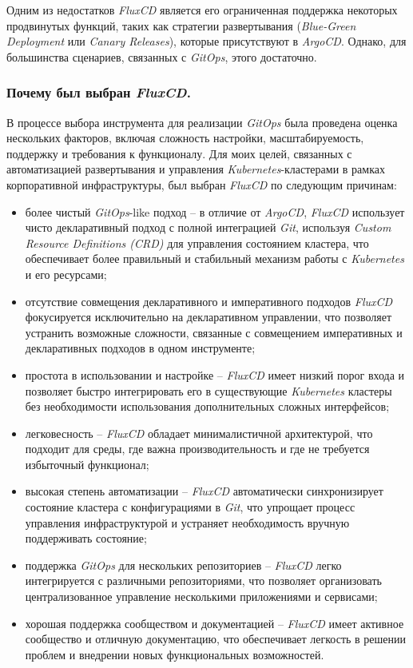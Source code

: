 Одним из недостатков \textit{FluxCD} является его ограниченная поддержка некоторых продвинутых функций, таких как стратегии развертывания (\textit{Blue-Green Deployment} или \textit{Canary Releases}), которые присутствуют в \textit{ArgoCD}. Однако, для большинства сценариев, связанных с \textit{GitOps}, этого достаточно.

\subsubsection{Почему был выбран \textit{FluxCD}.}
В процессе выбора инструмента для реализации \textit{GitOps} была проведена оценка нескольких факторов, включая сложность настройки, масштабируемость, поддержку и требования к функционалу. Для моих целей, связанных с автоматизацией развертывания и управления \textit{Kubernetes}-кластерами в рамках корпоративной инфраструктуры, был выбран \textit{FluxCD} по следующим причинам:

\begin{itemize}
    \item более чистый \textit{GitOps}-like подход -- в отличие от \textit{ArgoCD}, \textit{FluxCD} использует чисто декларативный подход с полной интеграцией \textit{Git}, используя \textit{Custom Resource Definitions (CRD)} для управления состоянием кластера, что обеспечивает более правильный и стабильный механизм работы с \textit{Kubernetes} и его ресурсами; 
    \item отсутствие совмещения декларативного и императивного подходов \textit{FluxCD} фокусируется исключительно на декларативном управлении, что позволяет устранить возможные сложности, связанные с совмещением императивных и декларативных подходов в одном инструменте; 
    \item простота в использовании и настройке -- \textit{FluxCD} имеет низкий порог входа и позволяет быстро интегрировать его в существующие \textit{Kubernetes} кластеры без необходимости использования дополнительных сложных интерфейсов; 
    \item легковесность -- \textit{FluxCD} обладает минималистичной архитектурой, что подходит для среды, где важна производительность и где не требуется избыточный функционал; 
    \item высокая степень автоматизации -- \textit{FluxCD} автоматически синхронизирует состояние кластера с конфигурациями в \textit{Git}, что упрощает процесс управления инфраструктурой и устраняет необходимость вручную поддерживать состояние; 
    \item поддержка \textit{GitOps} для нескольких репозиториев -- \textit{FluxCD} легко интегрируется с различными репозиториями, что позволяет организовать централизованное управление несколькими приложениями и сервисами; 
    \item хорошая поддержка сообществом и документацией -- \textit{FluxCD} имеет активное сообщество и отличную документацию, что обеспечивает легкость в решении проблем и внедрении новых функциональных возможностей. 
\end{itemize}


